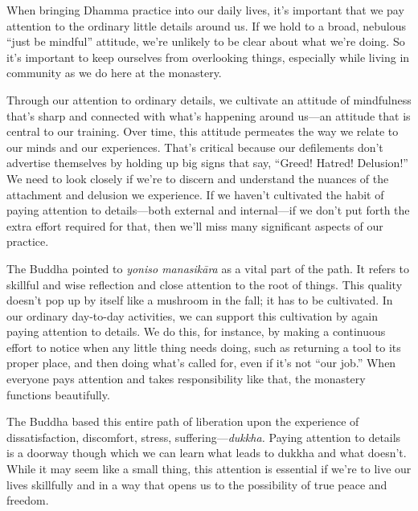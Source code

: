 
When bringing Dhamma practice into our daily lives, it's important that 
we pay attention to the ordinary little details around us. If we hold 
to a broad, nebulous ``just be mindful'' attitude, we're unlikely to be 
clear about what we're doing. So it's important to keep ourselves from 
overlooking things, especially while living in community as we do here 
at the monastery.

Through our attention to ordinary details, we cultivate an attitude of 
mindfulness that's sharp and connected with what's happening around 
us---an attitude that is central to our training. Over time, this 
attitude permeates the way we relate to our minds and our experiences. 
That's critical because our defilements don't advertise themselves by 
holding up big signs that say, ``Greed! Hatred! Delusion!'' We need to 
look closely if we're to discern and understand the nuances of the 
attachment and delusion we experience. If we haven't cultivated the 
habit of paying attention to details---both external and internal---if 
we don't put forth the extra effort required for that, then we'll miss 
many significant aspects of our practice.

The Buddha pointed to \emph{yoniso manasikāra} as a vital part of the 
path. It refers to skillful and wise reflection and close attention to 
the root of things. This quality doesn't pop up by itself like a 
mushroom in the fall; it has to be cultivated. In our ordinary 
day-to-day activities, we can support this cultivation by again paying 
attention to details. We do this, for instance, by making a continuous 
effort to notice when any little thing needs doing, such as returning a 
tool to its proper place, and then doing what's called for, even if 
it's not ``our job.'' When everyone pays attention and takes 
responsibility like that, the monastery functions beautifully.

The Buddha based this entire path of liberation upon the experience of 
dissatisfaction, discomfort, stress, suffering---\emph{dukkha.} Paying 
attention to details is a doorway though which we can learn what leads 
to dukkha and what doesn't. While it may seem like a small thing, this 
attention is essential if we're to live our lives skillfully and in a 
way that opens us to the possibility of true peace and freedom.


